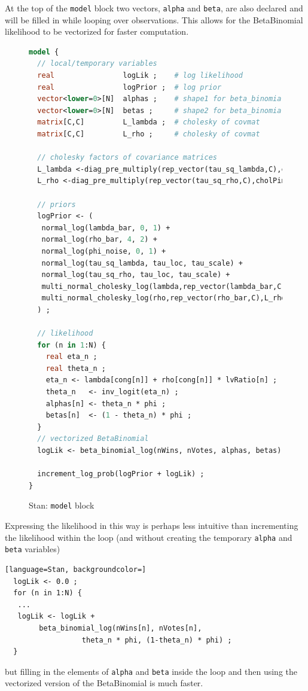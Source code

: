 At the top of the {\tt model} block two vectors, {\tt alpha} and {\tt beta}, are also declared and will be filled in while looping over observations. This allows for the BetaBinomial likelihood to be vectorized for faster computation.

\begin{figure}
\begin{lstlisting}[language=Stan, frame=trBL]
model {
  // local/temporary variables
  real                logLik ;    # log likelihood
  real                logPrior ;  # log prior
  vector<lower=0>[N]  alphas ;    # shape1 for beta_binomial 
  vector<lower=0>[N]  betas ;     # shape2 for beta_binomial
  matrix[C,C]         L_lambda ;  # cholesky of covmat
  matrix[C,C]         L_rho ;     # cholesky of covmat
  
  // cholesky factors of covariance matrices
  L_lambda <-diag_pre_multiply(rep_vector(tau_sq_lambda,C),cholPinverse);
  L_rho <-diag_pre_multiply(rep_vector(tau_sq_rho,C),cholPinverse);
  
  // priors
  logPrior <- (
   normal_log(lambda_bar, 0, 1) + 
   normal_log(rho_bar, 4, 2) + 
   normal_log(phi_noise, 0, 1) +
   normal_log(tau_sq_lambda, tau_loc, tau_scale) +
   normal_log(tau_sq_rho, tau_loc, tau_scale) +
   multi_normal_cholesky_log(lambda,rep_vector(lambda_bar,C),L_lambda) +
   multi_normal_cholesky_log(rho,rep_vector(rho_bar,C),L_rho) 
  ) ;
  
  // likelihood
  for (n in 1:N) {
    real eta_n ;
    real theta_n ;
    eta_n <- lambda[cong[n]] + rho[cong[n]] * lvRatio[n] ;
    theta_n   <- inv_logit(eta_n) ;    
    alphas[n] <- theta_n * phi ;
    betas[n]  <- (1 - theta_n) * phi ;
  }
  // vectorized BetaBinomial
  logLik <- beta_binomial_log(nWins, nVotes, alphas, betas) ; 
  
  increment_log_prob(logPrior + logLik) ; 
}
\end{lstlisting}
\caption{Stan: {\tt model} block}
\label{stan_model}
\end{figure}
%
Expressing the likelihood in this way is perhaps less intuitive than incrementing the likelihood within the loop (and without creating the temporary {\tt alpha} and {\tt beta} variables)

\begin{lstlisting}[language=Stan, backgroundcolor=]
  logLik <- 0.0 ;
  for (n in 1:N) {
   ...
   logLik <- logLik +
   		beta_binomial_log(nWins[n], nVotes[n], 
   				  theta_n * phi, (1-theta_n) * phi) ;
  }
\end{lstlisting}
%
\noindent but filling in the elements of {\tt alpha} and {\tt beta} inside the loop and then using the vectorized version of the BetaBinomial is much faster. 

